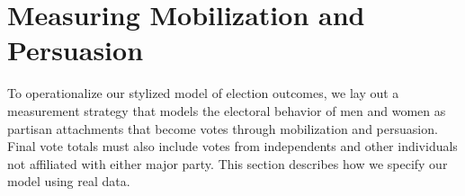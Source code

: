 \documentclass[12pt
               ,final
               ]{article}
\begin{document}

\section*{Measuring Mobilization and Persuasion}


To operationalize our stylized model of election outcomes, we lay out a measurement strategy that models the electoral behavior of men and women as partisan attachments that become votes through mobilization and persuasion. Final vote totals must also include votes from independents and other individuals not affiliated with either major party. This section describes how we specify our model using real data.
\end{document}
